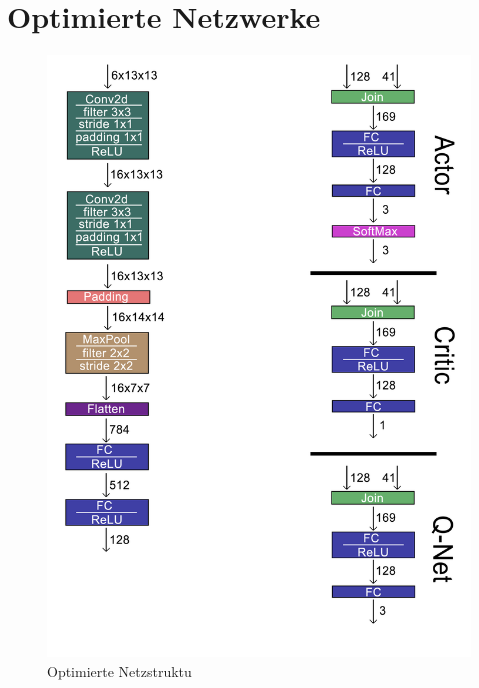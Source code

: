 \section{Optimierte Netzwerke}
\begin{figure}[H]
	\centering
	\includegraphics[scale=1.0]{Abbildungen/Anhang/NetzstrukturOptimized.png}
	\caption[Optimierte Netzstruktur]{Optimierte Netzstruktu}
	\label{fig:ConvNetOptimized}
\end{figure}



